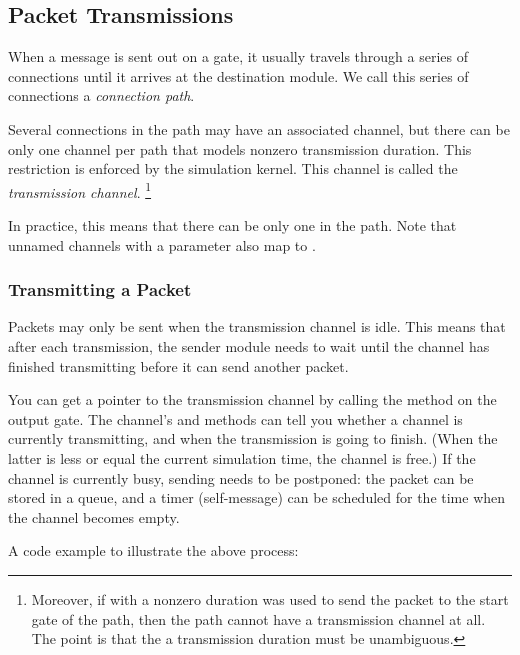 \subsection{Packet Transmissions}
\label{sec:simple-modules:packet-transmission}

When a message is sent out on a gate, it usually travels through
a series of connections until it arrives at the destination module.
We call this series of connections a \textit{connection path}.

Several connections in the path may have an associated channel,
but there can be only one channel per path that models nonzero
transmission duration. This restriction is enforced by the simulation
kernel. This channel is called the \textit{transmission channel}.
  \footnote{Moreover, if  with a nonzero duration
  was used to send the packet to the start gate of the path,
  then the path cannot have a transmission channel at all.
  The point is that the a transmission duration must be unambiguous.}

\begin{note}
  In practice, this means that there can be only one 
  in the path. Note that unnamed channels with a  parameter
  also map to .
\end{note}

\subsubsection{Transmitting a Packet}
\label{sec:simple-modules:transmitting-a-packet}

Packets may only be sent when the transmission channel is idle.
This means that after each transmission, the sender module needs
to wait until the channel has finished transmitting before it can
send another packet.

You can get a pointer to the transmission channel by calling the
 method on the output gate.
The channel's  and 
methods can tell you whether a channel is currently transmitting,
and when the transmission is going to finish. (When the latter is
less or equal the current simulation time, the channel is free.)
If the channel is currently busy, sending needs to be postponed:
the packet can be stored in a queue, and a timer (self-message) can be
scheduled for the time when the channel becomes empty.

A code example to illustrate the above process:


